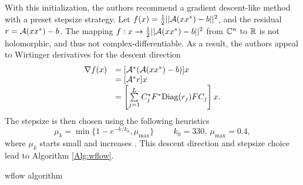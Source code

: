 \begin{enumerate}

With this initialization, the authors recommend a gradient descent-like method with a preset stepsize strategy.  Let $f(x) = \frac{1}{2}||{\mathcal A}(xx^*) - b||^2$, and the residual $r = {\mathcal A}(xx^*) - b$.  The mapping $f: x \rightarrow \frac{1}{2}||{\mathcal A}(xx^*) - b||^2$ from ${\mathbb C}^n$ to ${\mathbb R}$ is not holomorphic, and thus not complex-differentiable.  As a result, the authors appeal to Wirtinger derivatives \cite[Section 6]{DBLP:journals/tit/CandesLS15} for the descent direction
\begin{equation}			\label{Eqn:wflow_derivative}
\begin{array}{ll}
\nabla f(x)
	&	= [{\mathcal A}^*({\mathcal A}(xx^*) - b)]x
		\\
	&	= [{\mathcal A}^*r]x
		\\
	& = \left[ \sum\limits_{\substack{j=1}}^{\substack{L}}
					C_j^* F^* \textnormal{Diag}(r_j) F C_j \right] x.
\end{array}
\end{equation}
The stepsize is then chosen using the following heuristics
 \begin{equation} 			\label{Eqn:wflow_stepsize}
\mu_k = \min \{ 1-e^{-k/k_0}, \mu_{\max} \} \hspace{1cm} k_0 = 330, \ \mu_{\max} = 0.4,
\end{equation}
where $\mu_k$ starts small and increases  \cite[Section 2]{DBLP:journals/tit/CandesLS15}.  This descent direction and stepsize choice lead to Algorithm \ref{Alg:wflow}.

\begin{algorithm}[H]
\caption{wflow algorithm}	\label{Alg:wflow}


\end{algorithm}
\end{enumerate}

